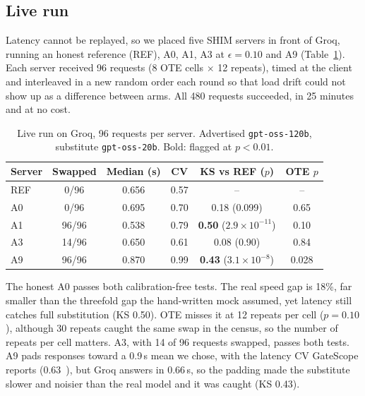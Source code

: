 \subsection{Live run}
Latency cannot be replayed, so we placed five SHIM servers in front of Groq, running an honest reference (REF), A0, A1,
A3 at $\epsilon = 0.10$ and A9 (Table~\ref{tab:live}). Each server received 96 requests
(8 OTE cells $\times$ 12 repeats), timed at the client and interleaved in a new random order each
round so that load drift could not show up as a difference between arms. All 480 requests
succeeded, in 25 minutes and at no cost.

\begin{table}[t]
\centering
\caption{Live run on Groq, 96 requests per server. Advertised \texttt{gpt-oss-120b}, substitute \texttt{gpt-oss-20b}. Bold: flagged at $p < 0.01$.}
\label{tab:live}
\small
\setlength{\tabcolsep}{4pt}
\begin{tabular}{@{}lccccc@{}}
\toprule
Server & Swapped & Median (s) & CV & KS vs REF ($p$) & OTE $p$ \\
\midrule
REF & 0/96 & 0.656 & 0.57 & -- & -- \\
A0 & 0/96 & 0.695 & 0.70 & 0.18 (0.099) & 0.65 \\
A1 & 96/96 & 0.538 & 0.79 & \textbf{0.50} ($2.9\!\times\!10^{-11}$) & 0.10 \\
A3 & 14/96 & 0.650 & 0.61 & 0.08 (0.90) & 0.84 \\
A9 & 96/96 & 0.870 & 0.99 & \textbf{0.43} ($3.1\!\times\!10^{-8}$) & 0.028 \\
\bottomrule
\end{tabular}
\end{table}

The honest A0 passes both calibration-free tests. The real speed gap is 18\%, far smaller than the
threefold gap the hand-written mock assumed, yet latency still catches full substitution (KS 0.50).
OTE misses it at 12 repeats per cell ($p = 0.10$), although 30 repeats caught the same swap in the
census, so the number of repeats per cell matters. A3, with 14 of 96 requests swapped, passes both
tests. A9 pads responses toward a 0.9\,s mean we chose, with the latency CV GateScope reports
(0.63~\cite{lin2026gatescope}), but Groq answers in 0.66\,s, so the padding made the substitute
slower and noisier than the real model and it was caught (KS 0.43).
